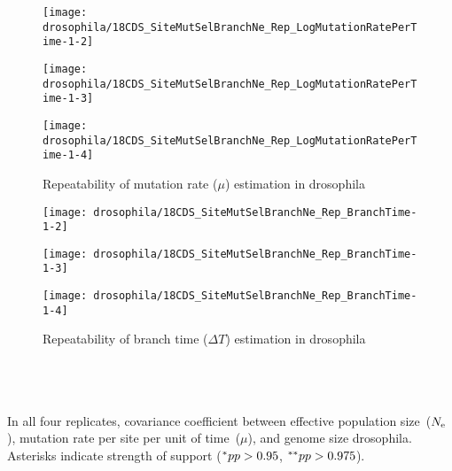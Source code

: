\begin{figure}[H]
    \centering
    \begin{minipage}{0.32\linewidth}
        \texttt{[image: drosophila/18CDS\_SiteMutSelBranchNe\_Rep\_LogMutationRatePerTime-1-2]}
    \end{minipage}    \hfill
    \begin{minipage}{0.32\linewidth}
        \texttt{[image: drosophila/18CDS\_SiteMutSelBranchNe\_Rep\_LogMutationRatePerTime-1-3]}
    \end{minipage}    \hfill
    \begin{minipage}{0.32\linewidth}
        \texttt{[image: drosophila/18CDS\_SiteMutSelBranchNe\_Rep\_LogMutationRatePerTime-1-4]}
    \end{minipage}
    \caption[Repeatability of mutation rate estimation in drosophila]{Repeatability of mutation rate ($\mu$) estimation in drosophila}
\end{figure}

\begin{figure}[H]
    \centering
    \begin{minipage}{0.32\linewidth}
        \texttt{[image: drosophila/18CDS\_SiteMutSelBranchNe\_Rep\_BranchTime-1-2]}
    \end{minipage}    \hfill
    \begin{minipage}{0.32\linewidth}
        \texttt{[image: drosophila/18CDS\_SiteMutSelBranchNe\_Rep\_BranchTime-1-3]}
    \end{minipage}    \hfill
    \begin{minipage}{0.32\linewidth}
        \texttt{[image: drosophila/18CDS\_SiteMutSelBranchNe\_Rep\_BranchTime-1-4]}
    \end{minipage}
    \caption[Repeatability of branch time estimation in drosophila]{Repeatability of branch time ($\Delta T$) estimation in drosophila}
\end{figure}

\begin{table}[H]
     \\
     \\
     \\
    
    \caption[Covariance matrix repeatability in drosophila]{
    In all four replicates, covariance coefficient between effective population size~($N_{\mathrm{e}}$), mutation rate per site per unit of time~($\mu$), and genome size drosophila.
    Asterisks indicate strength of support ($\smash{^{*}} pp > 0.95$, $\smash{^{**}} pp > 0.975$).}
\end{table}

